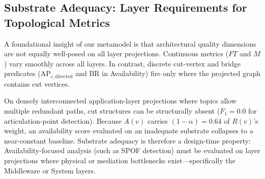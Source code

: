 \subsection{Substrate Adequacy: Layer Requirements for Topological Metrics}
\label{sec:model:substrate}

A foundational insight of our metamodel is that architectural quality dimensions are not equally well-posed on all layer projections. Continuous metrics ($FT$ and $M$) vary smoothly across all layers. In contrast, discrete cut-vertex and bridge predicates ($\mathrm{AP}_{c,\text{directed}}$ and $\mathrm{BR}$ in Availability) fire only where the projected graph contains cut vertices. 

On densely interconnected application-layer projections where topics allow multiple redundant paths, cut structures can be structurally absent ($F_1 = 0.0$ for articulation-point detection). Because $A(v)$ carries $(1-\alpha) = 0.64$ of $R(v)$'s weight, an availability score evaluated on an inadequate substrate collapses to a near-constant baseline. Substrate adequacy is therefore a design-time property: Availability-focused analysis (such as SPOF detection) must be evaluated on layer projections where physical or mediation bottlenecks exist---specifically the Middleware or System layers.
